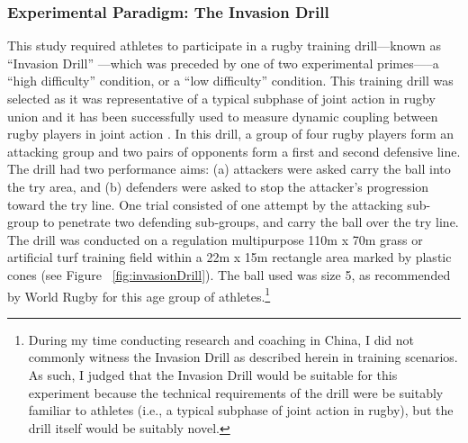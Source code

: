 \subsubsection{Experimental Paradigm: The Invasion Drill}
This study required athletes to participate in a rugby training drill---known as ``Invasion Drill'' \citep{Biscombe1998}---which was preceded by one of two experimental primes—--a ``high difficulty'' condition, or a ``low difficulty'' condition.  This training drill was selected as it was representative of a typical subphase of joint action in rugby union and it has been successfully used to measure dynamic coupling between rugby players in joint action \citep[see][]{Passos2011}.  In this drill, a group of four rugby players form an attacking group and two pairs of opponents form a first and second defensive line.  The drill had two performance aims: (a) attackers were asked carry the ball into the try area, and (b) defenders were asked to stop the attacker’s progression toward the try line.
One trial consisted of one attempt by the attacking sub-group to penetrate two defending sub-groups, and carry the ball over the try line. The drill was conducted on a regulation multipurpose 110m x 70m grass or artificial turf training field within a 22m x 15m rectangle area marked by plastic cones (see Figure ~\ref{fig:invasionDrill}). The ball used was size 5, as recommended by World Rugby for this age group of athletes.\footnote{During my time conducting research and coaching in China, I did not commonly witness the Invasion Drill as described herein in training scenarios. As such, I judged that the Invasion Drill would be suitable for this experiment because the technical requirements of the drill were be suitably familiar to athletes (i.e., a typical subphase of joint action in rugby), but the drill itself would be suitably novel.}




